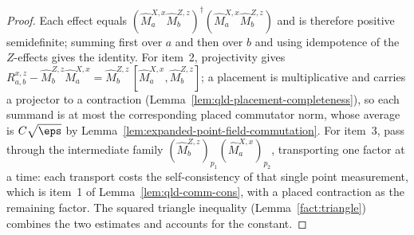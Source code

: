 \begin{proof}
	\leanok
	Each effect equals
	$(\hat{M}^{X,x}_{a}\hat{M}^{Z,z}_{b})^\dagger
	(\hat{M}^{X,x}_{a}\hat{M}^{Z,z}_{b})$ and is therefore positive
	semidefinite; summing first over $a$ and then over $b$ and using
	idempotence of the $Z$-effects gives the identity.
	For item~2, projectivity gives
	$R^{x,z}_{a,b} - \hat{M}^{Z,z}_{b}\hat{M}^{X,x}_{a}
	= \hat{M}^{Z,z}_{b}\,[\hat{M}^{X,x}_{a},\hat{M}^{Z,z}_{b}]$; a placement
	is multiplicative and carries a projector to a contraction
	(Lemma~\ref{lem:qld-placement-completeness}), so each summand is at most
	the corresponding placed commutator norm, whose average is
	$C\sqrt\eps$ by Lemma~\ref{lem:expanded-point-field-commutation}.
	For item~3, pass through the intermediate family
	$(\hat{M}^{Z,z}_{b})_{p_1}(\hat{M}^{X,x}_{a})_{p_2}$, transporting one
	factor at a time: each transport costs the self-consistency of that single
	point measurement, which is item~1 of Lemma~\ref{lem:qld-comm-cons}, with a
	placed contraction as the remaining factor. The squared triangle
	inequality (Lemma~\ref{fact:triangle}) combines the two estimates and
	accounts for the constant.
\end{proof}

